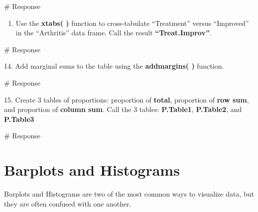 \documentclass[
  letterpaper,
  DIV=11,
  numbers=noendperiod]{scrreprt}
\newenvironment{Shaded}{\begin{snugshade}}{\end{snugshade}}
\newcommand{\CommentTok}[1]{\textcolor[rgb]{0.37,0.37,0.37}{#1}}
\providecommand{\tightlist}{%
  \setlength{\itemsep}{0pt}\setlength{\parskip}{0pt}}\usepackage{longtable,booktabs,array}
\begin{document}
\begin{Shaded}
\begin{Highlighting}[]
\CommentTok{\# Response}
\end{Highlighting}
\end{Shaded}

\begin{enumerate}
\def\labelenumi{\arabic{enumi}.}
\setcounter{enumi}{12}
\tightlist
\item
  Use the \textbf{xtabs( )} function to cross-tabulate ``Treatment''
  versus ``Improved'' in the ``Arthritis'' data frame. Call the result
  \textbf{``Treat.Improv''}.
\end{enumerate}

\begin{Shaded}
\begin{Highlighting}[]
\CommentTok{\# Response}
\end{Highlighting}
\end{Shaded}

14. Add marginal sums to the table using the \textbf{addmargins( )}
function.

\begin{Shaded}
\begin{Highlighting}[]
\CommentTok{\# Response}
\end{Highlighting}
\end{Shaded}

15. Create 3 tables of proportions: proportion of \textbf{total},
proportion of \textbf{row sum}, and proportion of \textbf{column sum}.
Call the 3 tables: \textbf{P.Table1}, \textbf{P.Table2}, and
\textbf{P.Table3}

\begin{Shaded}
\begin{Highlighting}[]
\CommentTok{\# Response}
\end{Highlighting}
\end{Shaded}


\chapter*{Barplots and Histograms}\label{barplots-and-histograms}


Barplots and Histograms are two of the most common ways to visualize
data, but they are often confused with one another.
\end{document}
